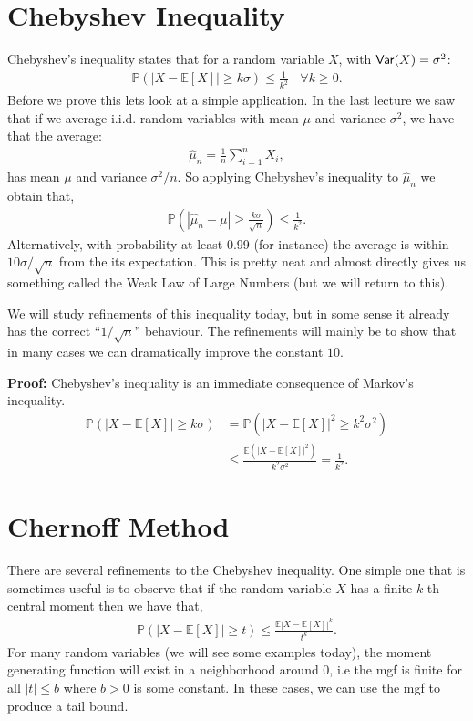 \documentclass[twoside,12pt]{article}
\begin{document}
\section{Chebyshev Inequality}
Chebyshev's inequality states that for a random variable $X$, with ${\sf Var}(X) = \sigma^2$:
\begin{align*}
\mathbb{P}( |X - \mathbb{E}[X]| \geq k \sigma) \leq \frac{1}{k^2}~~~~\forall k \geq 0.
\end{align*}
Before we prove this lets look at a simple application. In the last lecture we saw that if we average i.i.d. random variables with mean $\mu$ and variance $\sigma^2$, we have that the average:
\begin{align*}
\widehat{\mu}_n = \frac{1}{n} \sum_{i=1}^n X_i, 
\end{align*}
has mean $\mu$ and variance $\sigma^2/n$. So applying Chebyshev's inequality to $\widehat{\mu}_n$ we obtain that,
\begin{align*}
\mathbb{P}\left( |\widehat{\mu}_n - \mu| \geq \frac{k \sigma}{\sqrt{n}} \right) \leq \frac{1}{k^2}.
\end{align*}
Alternatively, with probability at least 0.99 (for instance) the average is within $10 \sigma / \sqrt{n}$ from the its expectation. This is pretty neat and almost directly gives us something called the Weak Law of Large Numbers (but we will return to this).

We will study refinements of this inequality today, but in some sense it already has the correct ``$1/\sqrt{n}$'' behaviour. The refinements will mainly be to show that in many cases we can dramatically improve the constant $10$.

{\bf Proof: } Chebyshev's inequality is an immediate consequence of Markov's inequality.
\begin{align*}
\mathbb{P}( |X - \mathbb{E}[X]| \geq k \sigma) &= \mathbb{P}( |X - \mathbb{E}[X]|^2 \geq k^2 \sigma^2) \\
&\leq \frac{\mathbb{E}(|X - \mathbb{E}[X]|^2)}{k^2 \sigma^2} = \frac{1}{k^2}.
\end{align*}

\section{Chernoff Method}
There are several refinements to the Chebyshev inequality. One simple one that is sometimes useful is to observe that if the random variable $X$ has a finite $k$-th central moment then we have that,
\begin{align*}
\mathbb{P}(|X - \mathbb{E}[X]| \geq t) \leq \frac{\mathbb{E} |X - \mathbb{E}[X]|^k }{t^k}.
\end{align*}
For many random variables (we will see some examples today), the moment generating function will exist in a neighborhood around 0, i.e the mgf is finite for all $|t| \leq b$ where $b > 0$ is some constant.
In these cases, we can use the mgf to produce a tail bound.
\end{document}
